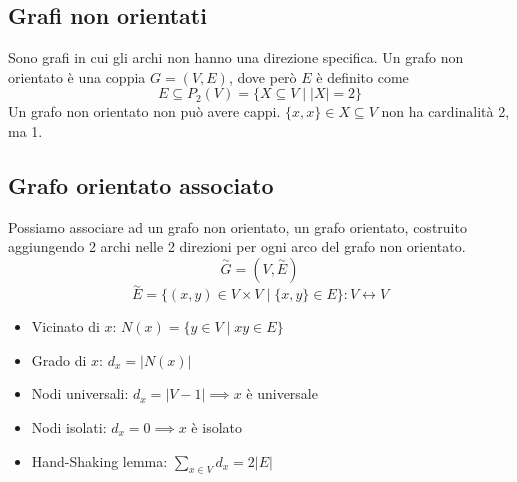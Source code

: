 \documentclass{article}
\begin{document}
\subsection{Grafi non orientati}
Sono grafi in cui gli archi non hanno una direzione specifica. Un grafo non orientato è una coppia \(G = (V,E)\), dove però \(E\) è definito come
\[E \subseteq P_2(V) = \{X \subseteq V \mid \lvert X \rvert = 2\}\]
Un grafo non orientato non può avere cappi. \(\{x,x\} \in X \subseteq V\) non ha cardinalità 2, ma 1.
\subsection*{Grafo orientato associato}
Possiamo associare ad un grafo non orientato, un grafo orientato, costruito aggiungendo 2 archi nelle 2 direzioni per ogni arco del grafo non orientato.
\[\overset{\sim}{G} = (V, \overset{\sim}{E})\]
\[\overset{\sim}{E} = \{(x,y) \in V \times V \mid \{x,y\} \in E\}: V \leftrightarrow V\]
\begin{itemize}
    \item Vicinato di \(x\): \(N(x) = \{y \in V \mid xy \in E\}\)
    \item Grado di \(x\): \(d_x = \lvert N(x) \rvert\)
    \item Nodi universali: \(d_x = \lvert V - 1 \rvert \implies x\) è universale
    \item Nodi isolati: \(d_x = 0 \implies x\) è isolato
    \item Hand-Shaking lemma: \(\displaystyle \sum_{x \in V} d_x = 2\lvert E \rvert\)
\end{itemize}
\end{document}

